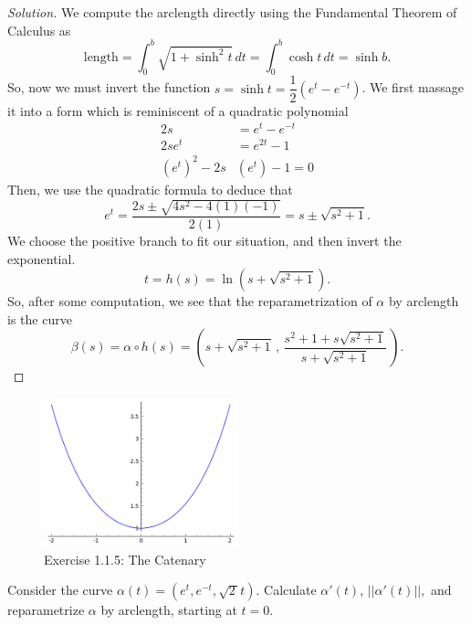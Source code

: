 \documentclass[Shifrin_Solutions_Spring_2018]{subfiles}
\begin{document}
\begin{proof}[Solution]
We compute the arclength directly using the Fundamental Theorem of Calculus as
\[
\text{length} = \int_0^b \sqrt{1 + \sinh^2 t } \, dt = \int_0^b \cosh t \, dt = \sinh b .
\]
So, now we must invert the function 
$s = \sinh t = \dfrac{1}{2} \left( e^t - e^{-t}\right)$. 
We first massage it into a form which is reminiscent of a quadratic polynomial
\begin{align*}
2s & = e^t - e^{-t} \\
2se^t &= e^{2t} - 1 \\
(e^t)^2  - 2 s& (e^t) - 1 = 0
\end{align*}
Then, we use the quadratic formula to deduce that
\[
e^t  = \dfrac{2s \pm \sqrt{4s^2 - 4(1)(-1)} }{2(1)} = s \pm \sqrt{s^2+1} .
\]
We choose the positive branch to fit our situation, and then invert the exponential.
\[ t = h(s) = \ln(  s + \sqrt{s^2+1} ) . \]
So, after some computation, we see that the reparametrization of $\alpha$ by 
arclength is the curve
\[
\beta(s) = \alpha\circ h(s) = \left(  s + \sqrt{s^2+1}\, , \,
\dfrac{s^2+1 + s\sqrt{s^2+1 } }{ s + \sqrt{s^2+1 } }\, \right).
\]
\end{proof}

\begin{figure}[h!]
\centering
\includegraphics[width=0.5\textwidth]{picturebook/ch1sec1/ex1-1-5}
\caption{Exercise 1.1.5: The Catenary}
\end{figure}



\clearpage



\begin{exercise}
Consider the curve $\alpha(t) = \left( e^t , e^{-t} , \sqrt{2\,} t \right)$. 
Calculate $\alpha'(t)$, $||\alpha'(t)||,$ and reparametrize $\alpha$ by arclength, 
starting at $t=0$.
\end{exercise}
\end{document}
